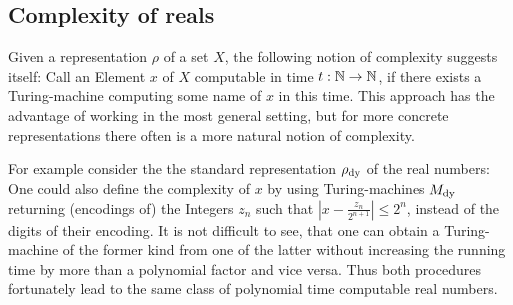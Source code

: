 	\subsection{Complexity of reals}\label{sec: Complexity of reals}

		Given a representation $\rho$ of a set $X$, the following notion of complexity suggests itself: Call an Element $x$ of $X$ computable in time $t:\operatorname{\mathbb{N}} \to \operatorname{\mathbb{N}}$, if there exists a Turing-machine computing some name of $x$ in this time. This approach has the advantage of working in the most general setting, but for more concrete representations there often is a more natural notion of complexity.

		For example consider the the standard representation $\rho_{\mathrm{dy}}$ of the real numbers: One could also define the complexity of $x$ by using Turing-machines $M_{\mathrm{dy}}$ returning (encodings of) the Integers $z_n$ such that $|x-\frac{z_n}{2^{n+1}}|\leq 2^n$, instead of the digits of their encoding. It is not difficult to see, that one can obtain a Turing-machine of the former kind from one of the latter without increasing the running time by more than a polynomial factor and vice versa. Thus both procedures fortunately lead to the same class of polynomial time computable real numbers.
